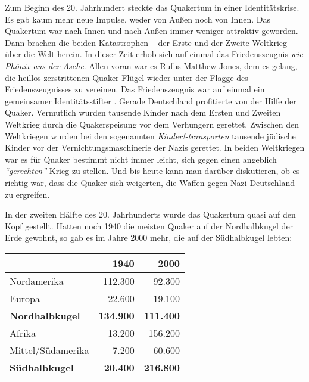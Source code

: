 Zum Beginn des 20. Jahrhundert steckte das Quakertum in einer Identitätskrise.
Es gab kaum mehr neue Impulse, weder von Außen
noch von Innen. Das Quakertum war
nach Innen und nach Außen immer weniger attraktiv geworden. Dann brachen die
beiden Katastrophen -- der Erste und der Zweite Weltkrieg --
über die Welt
herein. In dieser Zeit erhob sich auf einmal das Friedenszeugnis
\textit{wie
Phönix aus der Asche}. Allen voran war es Rufus Matthew Jones,
 dem
es gelang, die heillos zerstrittenen Quaker-Flügel wieder unter der Flagge des
Friedenszeugnisses zu vereinen. Das Friedenszeugnis war auf einmal ein
gemeinsamer Identitätsstifter . Gerade Deutschland
 profitierte von der Hilfe der
Quaker. Vermutlich wurden tausende Kinder nach dem Ersten und Zweiten Weltkrieg
durch die Quakerspeisung  vor dem Verhungern gerettet.
Zwischen den Weltkriegen
wurden bei den sogenannten \textit{Kinder!-transporten}
tausende jüdische Kinder 
vor der Vernichtungsmaschinerie der Nazis gerettet. In beiden Weltkriegen war es
für Quaker bestimmt nicht immer leicht, sich gegen einen
angeblich \textit{"`gerechten"'}
Krieg zu stellen. Und bis heute kann man darüber diskutieren, ob es richtig
war, dass die Quaker sich weigerten, die Waffen gegen Nazi-Deutschland zu
ergreifen.

\medskip

In der zweiten Hälfte des 20. Jahrhunderts wurde das Quakertum quasi auf den
Kopf
gestellt. Hatten noch 1940 die meisten Quaker auf der Nordhalbkugel der Erde
gewohnt, so gab es im Jahre 2000 mehr, die auf der Südhalbkugel lebten:

\begin{center}
\begin{tabular}{|l|r|r|} \hline
                        & \textbf{1940}        & \textbf{2000}    \\ \hline
\hline
Nordamerika             & 112.300              & 92.300           \\ \hline
Europa                  & 22.600               & 19.100           \\ \hline
\textbf{Nordhalbkugel}  & \textbf{134.900}     & \textbf{111.400} \\ \hline
Afrika                  & 13.200               & 156.200          \\ \hline
Mittel/Südamerika       & 7.200                & 60.600           \\ \hline
\textbf{Südhalbkugel}   & \textbf{20.400}      & \textbf{216.800} \\ \hline
\end{tabular}
\end{center}


